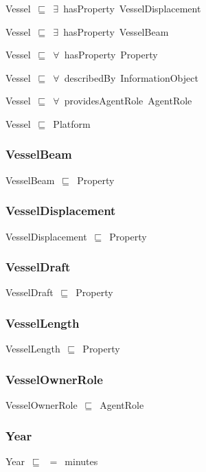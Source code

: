 \documentclass{article}
\begin{document}
Vessel~\ensuremath{\sqsubseteq}~\ensuremath{\exists}~hasProperty~VesselDisplacement~

Vessel~\ensuremath{\sqsubseteq}~\ensuremath{\exists}~hasProperty~VesselBeam~

Vessel~\ensuremath{\sqsubseteq}~\ensuremath{\forall}~hasProperty~Property~

Vessel~\ensuremath{\sqsubseteq}~\ensuremath{\forall}~describedBy~InformationObject~

Vessel~\ensuremath{\sqsubseteq}~\ensuremath{\forall}~providesAgentRole~AgentRole~

Vessel~\ensuremath{\sqsubseteq}~Platform~

\subsubsection*{VesselBeam}

VesselBeam~\ensuremath{\sqsubseteq}~Property~

\subsubsection*{VesselDisplacement}

VesselDisplacement~\ensuremath{\sqsubseteq}~Property~

\subsubsection*{VesselDraft}

VesselDraft~\ensuremath{\sqsubseteq}~Property~

\subsubsection*{VesselLength}

VesselLength~\ensuremath{\sqsubseteq}~Property~

\subsubsection*{VesselOwnerRole}

VesselOwnerRole~\ensuremath{\sqsubseteq}~AgentRole~

\subsubsection*{Year}

Year~\ensuremath{\sqsubseteq}~\ensuremath{=}~minutes~
\end{document}
